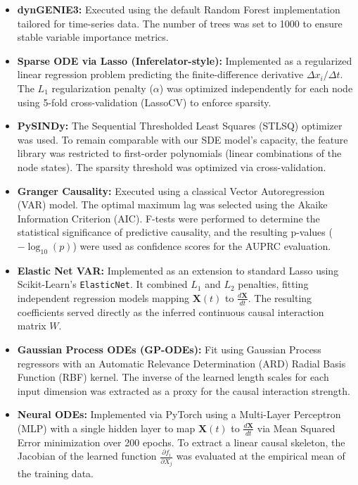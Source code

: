 \documentclass[10pt, aps, rmp,  twocolumn, superscriptaddress, floatfix, showkeys]{revtex4-2}
\begin{document}
\begin{itemize}
    \item \textbf{dynGENIE3:} Executed using the default Random Forest implementation tailored for time-series data. The number of trees was set to 1000 to ensure stable variable importance metrics.
    \item \textbf{Sparse ODE via Lasso (Inferelator-style):} Implemented as a regularized linear regression problem predicting the finite-difference derivative $\Delta x_i / \Delta t$. The $L_1$ regularization penalty ($\alpha$) was optimized independently for each node using 5-fold cross-validation (LassoCV) to enforce sparsity.
    \item \textbf{PySINDy:} The Sequential Thresholded Least Squares (STLSQ) optimizer was used. To remain comparable with our SDE model's capacity, the feature library was restricted to first-order polynomials (linear combinations of the node states). The sparsity threshold was optimized via cross-validation.
    \item \textbf{Granger Causality:} Executed using a classical Vector Autoregression (VAR) model. The optimal maximum lag was selected using the Akaike Information Criterion (AIC). F-tests were performed to determine the statistical significance of predictive causality, and the resulting p-values ($- \log_{10}(p)$) were used as confidence scores for the AUPRC evaluation.
    \item \textbf{Elastic Net VAR:} Implemented as an extension to standard Lasso using Scikit-Learn's \texttt{ElasticNet}. It combined $L_1$ and $L_2$ penalties, fitting independent regression models mapping $\mathbf{X}(t)$ to $\frac{d\mathbf{X}}{dt}$. The resulting coefficients served directly as the inferred continuous causal interaction matrix $W$.
    \item \textbf{Gaussian Process ODEs (GP-ODEs):} Fit using Gaussian Process regressors with an Automatic Relevance Determination (ARD) Radial Basis Function (RBF) kernel. The inverse of the learned length scales for each input dimension was extracted as a proxy for the causal interaction strength.
    \item \textbf{Neural ODEs:} Implemented via PyTorch using a Multi-Layer Perceptron (MLP) with a single hidden layer to map $\mathbf{X}(t)$ to $\frac{d\mathbf{X}}{dt}$ via Mean Squared Error minimization over 200 epochs. To extract a linear causal skeleton, the Jacobian of the learned function $\frac{\partial f_i}{\partial X_j}$ was evaluated at the empirical mean of the training data.

\end{itemize}
\end{document}
